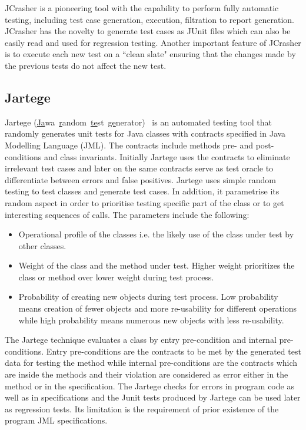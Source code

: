 \noindent JCrasher is a pioneering tool with the capability to perform fully automatic testing, including test case generation, execution, filtration to report generation. JCrasher has the novelty to generate test cases as JUnit files which can also be easily read and used for regression testing. Another important feature of JCrasher is to execute each new test on a ``clean slate" ensuring that the changes made by the previous tests do not affect the new test.  



\subsection{Jartege}
Jartege (\uline{Ja}wa~\uline{r}andom~\uline{te}st~\uline{ge}nerator)~\cite{Oriat2004} is an automated testing tool that randomly generates unit tests for Java classes with contracts specified in Java Modelling Language (JML). The contracts include methods pre- and post-conditions and class invariants. Initially Jartege uses the contracts to eliminate irrelevant test cases and later on the same contracts serve as test oracle to differentiate between errors and false positives. Jartege uses simple random testing to test classes and generate test cases. In addition, it parametrise its random aspect in order to prioritise testing specific part of the class or to get interesting sequences of calls. The parameters include the following: 
\begin{itemize}
\item Operational profile of the classes i.e. the likely use of the class under test by other classes.  
\item Weight of the class and the method under test. Higher weight prioritizes the class or method over lower weight during test process. 
\item Probability of creating new objects during test process. Low probability means creation of fewer objects and more re-usability for different operations while high probability means numerous new objects with less re-usability.
\end{itemize}

\noindent The Jartege technique evaluates a class by entry pre-condition and internal pre-conditions. Entry pre-conditions are the contracts to be met by the generated test data for testing the method while internal pre-conditions are the contracts which are inside the methods and their violation are considered as error either in the method or in the specification. The Jartege checks for errors in program code as well as in specifications and the Junit tests produced by Jartege can be used later as regression tests. Its limitation is the requirement of prior existence of the program JML specifications.

